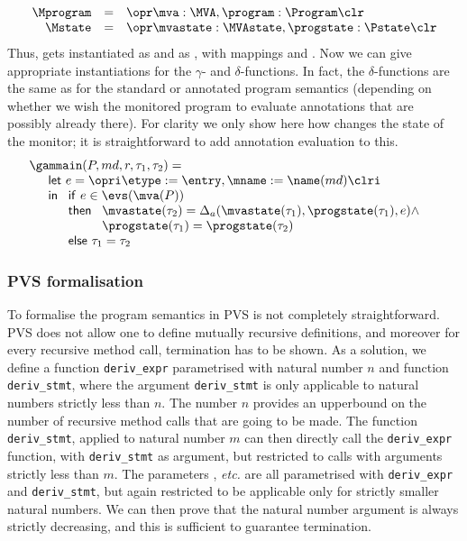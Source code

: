 \[ 
\begin{array}{rcl}
\Mprogram & =  & \opr \mva : \MVA, \program : \Program \clr\\
\Mstate & = & \opr \mvastate : \MVAstate, \progstate : \Pstate \clr
\end{array}
\]
Thus, \FullProgram gets instantiated as \Mprogram and \FullState as
\Mstate, with mappings \program and \progstate. Now we can give
appropriate instantiations for the \(\gamma\)- and
\(\delta\)-functions. In fact, the \(\delta\)-functions are the same as
for the standard or annotated program semantics (depending on whether
we wish the monitored program to evaluate annotations that are
possibly already there). For clarity we only show here how \gammain
changes the state of the monitor; it is straightforward to add 
annotation evaluation to this. 
\[
\begin{array}{l}
\gammain(P, md, r, \tau_1, \tau_2) = \\
\quad
\begin{array}[t]{l}
\mathsf{let\ } e = \opri \etype := \entry, \mname := \name(md) \clri \\
\mathsf{in\ }
\begin{array}[t]{l}
\mathsf{if\ }  e \in \evs(\mva(P)) \\
\mathsf{then\ }\begin{array}[t]{l}
       \mvastate(\tau_2) = \Delta_a(\mvastate(\tau_1),
\progstate(\tau_1), e) \wedge \\
      \progstate(\tau_1) = \progstate(\tau_2)
      \end{array}\\
\mathsf{else\ } \tau_1 = \tau_2
\end{array}
\end{array}
\end{array}
\]


\subsubsection{PVS formalisation}
To formalise the program semantics in PVS is not completely
straightforward. PVS does not allow one to define mutually recursive
definitions, and moreover for every recursive method call, termination
has to be shown. As a solution, we define a function
\texttt{deriv\_expr} parametrised with 
natural number \(n\) and function \texttt{deriv\_stmt}, where the
argument \texttt{deriv\_stmt} is only applicable to natural numbers
strictly less than \(n\). The number \(n\) provides an upperbound on
the number of recursive method calls that are going to be made.  The
function \texttt{deriv\_stmt}, applied to natural number \(m\) can
then directly call the \texttt{deriv\_expr} function, with
\texttt{deriv\_stmt} as argument, but restricted to calls with arguments
strictly less than \(m\). The parameters \gammain, \gammanorm
\emph{etc.} are all parametrised with \texttt{deriv\_expr} and
\texttt{deriv\_stmt}, but again restricted to be applicable only for
strictly smaller natural numbers. We can then prove that the natural
number argument is always strictly decreasing, and this is sufficient
to guarantee termination.







